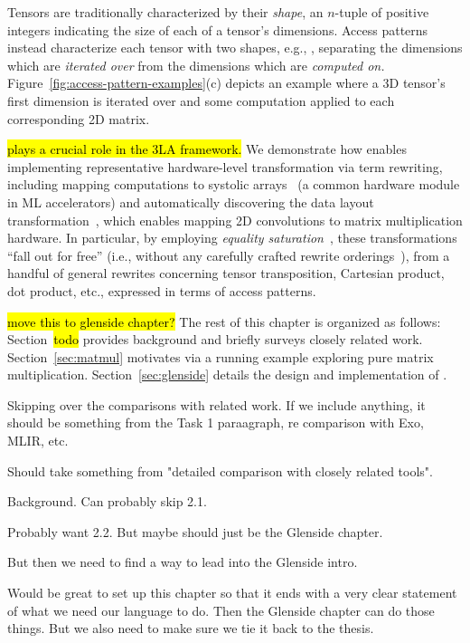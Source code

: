 Tensors are traditionally characterized
  by their \textit{shape},
  an $n$-tuple 
  of positive integers
  indicating the size of each
  of a tensor's dimensions.
Access patterns instead characterize
  each tensor with two shapes, e.g.,
  , separating
  the dimensions which are \textit{iterated over} from
  the dimensions which are \textit{computed on.}
Figure~\ref{fig:access-pattern-examples}(c)
  depicts an example where a 3D tensor's
  first dimension is iterated over and
  some computation applied to each
  corresponding 2D matrix.

\g \hl{
 plays a crucial role in the 3LA framework.
}
We demonstrate how \g
  enables implementing representative
  hardware-level transformation via term rewriting,
  including mapping computations
  to systolic arrays~\cite{jouppi2017tpu}
  (a common hardware module in ML accelerators)
  and automatically discovering the
   data layout transformation~\cite{im2col},
  which enables mapping 2D convolutions
  to matrix multiplication hardware.
In particular,
  by employing \textit{equality saturation}~\cite{willsey2021egg},
  these transformations ``fall out for free''
  (i.e., without any carefully crafted
  rewrite orderings~\cite{phase-ordering}),
  from a handful of general rewrites concerning tensor
  transposition, Cartesian product, dot product, etc.,
  expressed in terms of access patterns.


\hl{move this to glenside chapter?}
 The rest of this chapter is organized as follows:
Section~\hl{todo} provides background
  and briefly surveys closely related work.
Section~\ref{sec:matmul} motivates
  \g via a running example exploring
  pure matrix multiplication.
Section~\ref{sec:glenside} details the
  design and implementation of \g.


Skipping over the comparisons with related work.
If we include anything, it should be something
  from the Task 1 paraagraph, re comparison with Exo, MLIR, etc.

Should take something from "detailed comparison
  with closely related tools".

Background. Can probably skip 2.1.

Probably want 2.2. But maybe should just be the Glenside chapter.

But then we need to find a way
  to lead into the Glenside intro.

Would be great to set up this chapter
  so that it ends with a very clear statement
  of what we need our language to do.
Then the Glenside chapter can do those things.
But we also need to make sure
  we tie it back to the thesis.


